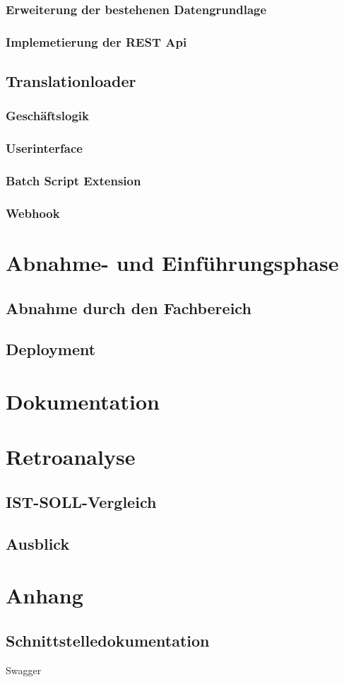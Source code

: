 \documentclass[oneside]{article}
\begin{document}
  \subsubsection{Erweiterung der bestehenen Datengrundlage}
  \subsubsection{Implemetierung der REST Api}
  \subsection{Translationloader}
  \subsubsection{Geschäftslogik}
  \subsubsection{Userinterface}
  \subsubsection{Batch Script Extension}
  \subsubsection{Webhook}
  \section{Abnahme- und Einführungsphase}
  \subsection{Abnahme durch den Fachbereich}
  \subsection{Deployment}
  \section{Dokumentation}
  \section{Retroanalyse}
  \subsection{IST-SOLL-Vergleich}
  \subsection{Ausblick}
  \setcounter{section}{0}
  \renewcommand{\thesection}{\MakeUppercase{\alph{section}}}
  \section{Anhang}
  \subsection{Schnittstelledokumentation}
  Swagger
\end{document}
